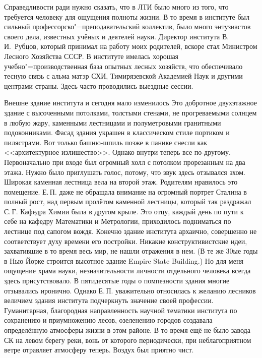 Справедливости ради нужно сказать, что в ЛТИ было много из того, что требуется человеку для ощущения полноты жизни.
В то время в институте был сильный про\-фес\-сор\-с\-ко"=пре\-по\-да\-ва\-тель\-с\-кий коллектив,
было много энтузиастов своего дела, известных учёных и деятелей науки.
Директор института В.\,И.~Рубцов, который принимал на работу моих родителей, вскоре стал Министром Лесного Хозяйства СССР.
В институте имелась хорошая учеб\-но"=про\-из\-вод\-с\-т\-вен\-ная база опытных лесных хозяйств, что обеспечивало тесную связь с альма матэр СХИ, Тимирязевской Академией Наук и другими центрами страны. Здесь часто проводились выездные сессии.

Внешне здание института и сегодня мало изменилось Это добротное двухэтажное здание с высоченными потолками, толстыми стенами, не прогреваемыми солнцем в любую жару, каменными лестницами и полуметровыми гранитными подоконниками. Фасад здания украшен в классическом стиле портиком и пилястрами. Вот только башню-шпиль позже в панике снесли как <<архитектурное излишество>>. Однако внутри теперь все по-другому. Первоначально при входе был огромный холл с потолком прорезанным на два этажа. Нужно было приглушать голос, потому, что звук здесь отзывался эхом. Широкая каменная лестница вела на второй этаж. Родителям нравилось это помещение. Е.\,П. даже не обращала внимание на огромный портрет Сталина в полный рост, над первым пролётом каменной лестницы, который так раздражал С.\,Г. Кафедра Химии была в другом крыле. Это отцу, каждый день по пути к себе на кафедру Математики и Метрологии, приходилось подниматься по лестнице под сапогом вождя. Конечно здание института архаично, совершенно не соответствует духу времени его постройки. Никакие конструктивистские идеи, захватившие в то время весь мир, не нашли отражения в нем. (В те же 30ые годы в Нью Йорке строится высотное здание Empire State Building.) Но для меня ощущение храма науки, незначительности личности отдельного человека всегда здесь присутствовало. В пятидесятые годы о помпезности здания многие отзывались иронично. Однако Е.\,П. уважительно относилась к желанию лесников величием здания института подчеркнуть значение своей профессии. Гуманитарная, благородная направленность научной тематики института по сохранению и приумножению лесов, озеленению городов создавала определённую атмосферы жизни в этом районе. В то время ещё не было завода СК на левом берегу реки, вонь от которого периодически, при неблагоприятном ветре отравляет атмосферу теперь. Воздух был приятно чист.

